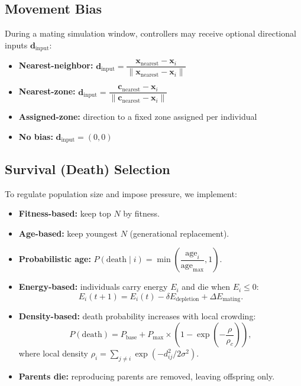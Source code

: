 \documentclass[dvipsnames,format=sigconf,anonymous=false,review=false]{acmart}
\begin{document}
\subsection{Movement Bias}
\label{sec:movement}
During a mating simulation window, controllers may receive optional directional inputs $\mathbf{d}_{\text{input}}$:
\begin{itemize}
  \item \textbf{Nearest-neighbor:}\;\;
  $\mathbf{d}_{\text{input}}=\dfrac{\mathbf{x}_{\text{nearest}}-\mathbf{x}_i}{\|\mathbf{x}_{\text{nearest}}-\mathbf{x}_i\|}$
  \item \textbf{Nearest-zone:}\;\;
  $\mathbf{d}_{\text{input}}=\dfrac{\mathbf{c}_{\text{nearest}}-\mathbf{x}_i}{\|\mathbf{c}_{\text{nearest}}-\mathbf{x}_i\|}$
  \item \textbf{Assigned-zone:} direction to a fixed zone assigned per individual
  \item \textbf{No bias:} $\mathbf{d}_{\text{input}}=(0,0)$
\end{itemize}

\subsection{Survival (Death) Selection}
\label{sec:death_sel}
To regulate population size and impose pressure, we implement:
\begin{itemize}
  \item \textbf{Fitness-based:} keep top $N$ by fitness.
  \item \textbf{Age-based:} keep youngest $N$ (generational replacement).
  \item \textbf{Probabilistic age:} $P(\mathrm{death}\mid i)=\min\!\left(\dfrac{\mathrm{age}_i}{\mathrm{age}_{\max}},1\right)$.
  \item \textbf{Energy-based:} individuals carry energy $E_i$ and die when $E_i\le 0$:
  \begin{equation}
  E_i(t+1)=E_i(t)-\delta E_{\text{depletion}}+\Delta E_{\text{mating}}.
  \end{equation}
  \item \textbf{Density-based:} death probability increases with local crowding:
  \begin{equation}
  \label{eq:density_death}
  P(\mathrm{death})=P_{\text{base}}+P_{\text{max}}\times\left(1-\exp\left(-\frac{\rho}{\rho_c}\right)\right),
  \end{equation}
  where local density $\rho_i = \sum_{j \neq i} \exp\left(-d_{ij}^2/2\sigma^2\right)$.
  \item \textbf{Parents die:} reproducing parents are removed, leaving offspring only.
\end{itemize}
\end{document}
